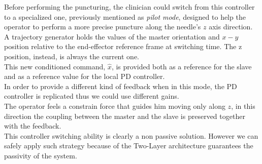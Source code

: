 Before performing the puncturing, the clinician could switch from this controller to a specialized one, previously mentioned as \textit{pilot mode}, designed to help the operator to perform a more precise puncture along the needle's $z$ axis direction.\\
A trajectory generator holds the values of the master orientation and $x-y$ position relative to the end-effector reference frame at switching time. The z position, instead, is always the current one.\\
This new conditioned command, $\hat{x}$, is provided both as a reference for the slave and as a reference value for the local PD controller.\\
In order to provide a different kind of feedback when in this mode, the PD controller is replicated thus we could use different gains.\\
The operator feels a constrain force that guides him moving only along $z$, in this direction the coupling between the master and the slave is preserved together with the feedback.\\
This controller switching ability is clearly a non passive solution. However we can safely apply such strategy because of the Two-Layer architecture guarantees the passivity of the system.

%
%
%
%
%
%
